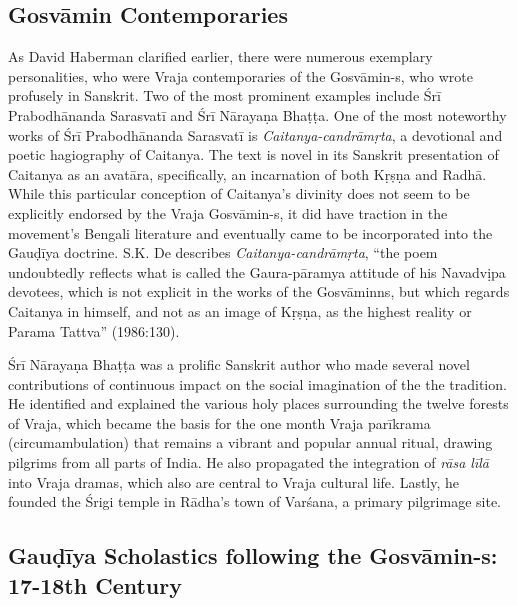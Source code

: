 \subsection*{Gosvāmin Contemporaries}

As David Haberman clarified earlier, there were numerous exemplary personalities, who were Vraja contemporaries of the Gosvāmin-s, who wrote profusely in Sanskrit. Two of the most prominent examples include Śrī Prabodhānanda Sarasvatī and Śrī Nārayaṇa Bhaṭṭa. One of the most noteworthy works of Śrī Prabodhānanda Sarasvatī is {\sl Caitanya-candrāmṛta}, a devotional and poetic hagiography of Caitanya. The text is novel in its Sanskrit presentation of Caitanya as an avatāra, specifically, an incarnation of both Kṛṣṇa and Radhā. While this particular conception of Caitanya’s divinity does not seem to be explicitly endorsed by the Vraja Gosvāmin-s, it did have traction in the movement’s Bengali literature and eventually came to be incorporated into the Gauḍīya doctrine. S.K. De describes {\sl Caitanya-candrāmṛta}, “the poem undoubtedly reflects what is called the Gaura-pāramya attitude of his Navadvịpa devotees, which is not explicit in the works of the Gosvāminns, but which regards Caitanya in himself, and not as an image of Kṛṣṇa, as the highest reality or Parama Tattva” (1986:130). 

Śrī Nārayaṇa Bhaṭṭa was a prolific Sanskrit author who made several novel contributions of continuous impact on the social imagination of the the tradition. He identified and explained the various holy places surrounding the twelve forests of Vraja, which became the basis for the one month Vraja parīkrama (circumambulation) that remains a vibrant and popular annual ritual, drawing pilgrims from all parts of India. He also propagated the integration of {\sl rāsa līlā} into Vraja dramas, which also are central to Vraja cultural life. Lastly, he founded the Śrigi temple in Rādha’s town of Varśana, a primary pilgrimage site. 
\newpage

\subsection*{Gauḍīya Scholastics following the Gosvāmin-s: 17-18th Century}

